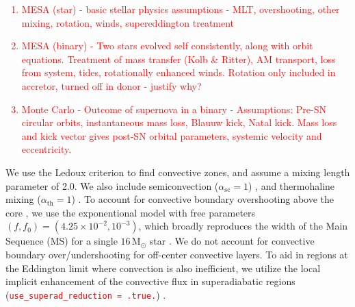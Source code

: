 \documentclass[linenumbers,trackchanges,twocolumn]{aastex701}
\newcommand{\Mdot}{\mathrm{M}_{\odot}}
\newcommand{\red}{\textcolor{red}}
\begin{document}
\red{
\begin{enumerate}
    \item MESA (star) - basic stellar physics assumptions - MLT, overshooting, other mixing, rotation, winds, supereddington treatment
    \item MESA (binary) - Two stars evolved self consistently, along with orbit equations. Treatment of mass transfer (Kolb \& Ritter), AM transport, loss from system, tides, rotationally enhanced winds. Rotation only included in accretor, turned off in donor - justify why? 
    \item Monte Carlo - Outcome of supernova in a binary - Assumptions: Pre-SN circular orbits, instantaneous mass loss, Blauuw kick, Natal kick. Mass loss and kick vector gives post-SN orbital parameters, systemic velocity and eccentricity.
\end{enumerate}
}

We use the Ledoux criterion \citep{1947ApJ...105..305L} to find convective zones, and assume a mixing length parameter of 2.0. We also include semiconvection ($\alpha_{\mathrm{sc}}=1$) \citep{1983A&A...126..207L}, and thermohaline mixing ($\alpha_{\mathrm{th}}=1$) \citep{1980A&A....91..175K}. To account for convective boundary overshooting above the core \citep{2000A&A...360..952H,2018ApJ...859..100C}, we use the exponentional model with free parameters $(f,f_0) = (4.25 \times 10^{-2}, 10^{-3})$, which broadly reproduces the width of the Main Sequence (MS) for a single $16 \, \Mdot$ star \citep{2011A&A...530A.115B}. We do not account for convective boundary over/undershooting for off-center convective layers. To aid in regions at the Eddington limit where convection is also inefficient, we utilize the local implicit enhancement of the convective flux in superadiabatic regions (\texttt{\red{use\_superad\_reduction = .true.}}) \citep{2023ApJS..265...15J}.
\end{document}
